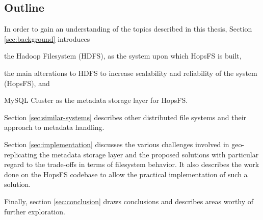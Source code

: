 \subsection{Outline}

In order to gain an understanding of the topics described in this thesis, Section \ref{sec:background} introduces 
\begin{inparaenum}[1)]
\item the Hadoop Filesystem (HDFS), as the system upon which HopsFS is built,
\item the main alterations to HDFS to increase scalability and reliability of the system (HopsFS), and
\item MySQL Cluster as the metadata storage layer for HopsFS.
\end{inparaenum}

Section \ref{sec:similar-systems} describes other distributed file systems and their approach to metadata handling.

Section \ref{sec:implementation} discusses the various challenges involved in geo-replicating the metadata storage layer and the proposed solutions with particular regard to the trade-offs in terms of filesystem behavior.
It also describes the work done on the HopsFS codebase to allow the practical implementation of such a solution.

Finally, section \ref{sec:conclusion} draws conclusions and describes areas worthy of further exploration.
